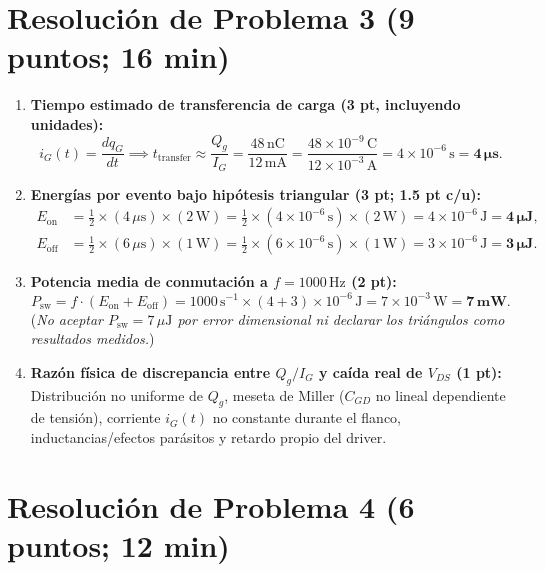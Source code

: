 \documentclass[11pt, a4paper]{article}
\begin{document}
\newpage
\section*{Resolución de Problema 3 (9 puntos; 16 min)}

\begin{enumerate}[label=\arabic*., noitemsep, topsep=2pt]
    \item \textbf{Tiempo estimado de transferencia de carga (3 pt, incluyendo unidades):}
    \[
        i_G(t) = \frac{dq_G}{dt} \implies t_{\text{transfer}} \approx \frac{Q_g}{I_G} = \frac{48\,\text{nC}}{12\,\text{mA}} = \frac{48 \times 10^{-9}\,\text{C}}{12 \times 10^{-3}\,\text{A}} = 4 \times 10^{-6}\,\text{s} = \mathbf{4\,\mu\text{s}}.
    \]
    \item \textbf{Energías por evento bajo hipótesis triangular (3 pt; 1.5 pt c/u):}
    \begin{align*}
        E_{\text{on}} &= \frac{1}{2} \times (4\,\mu\text{s}) \times (2\,\text{W}) = \frac{1}{2} \times (4 \times 10^{-6}\,\text{s}) \times (2\,\text{W}) = 4 \times 10^{-6}\,\text{J} = \mathbf{4\,\mu\text{J}}, \\
        E_{\text{off}} &= \frac{1}{2} \times (6\,\mu\text{s}) \times (1\,\text{W}) = \frac{1}{2} \times (6 \times 10^{-6}\,\text{s}) \times (1\,\text{W}) = 3 \times 10^{-6}\,\text{J} = \mathbf{3\,\mu\text{J}}.
    \end{align*}
    \item \textbf{Potencia media de conmutación a $f = 1000\,\text{Hz}$ (2 pt):}
    \[
        P_{\text{sw}} = f \cdot (E_{\text{on}} + E_{\text{off}}) = 1000\,\text{s}^{-1} \times (4 + 3)\times 10^{-6}\,\text{J} = 7 \times 10^{-3}\,\text{W} = \mathbf{7\,\text{mW}}.
    \]
    (\textit{No aceptar $P_{\text{sw}} = 7\,\mu\text{J}$ por error dimensional ni declarar los triángulos como resultados medidos.})
    \item \textbf{Razón física de discrepancia entre $Q_g/I_G$ y caída real de $V_{DS}$ (1 pt):} Distribución no uniforme de $Q_g$, meseta de Miller ($C_{GD}$ no lineal dependiente de tensión), corriente $i_G(t)$ no constante durante el flanco, inductancias/efectos parásitos y retardo propio del driver.
\end{enumerate}

\section*{Resolución de Problema 4 (6 puntos; 12 min)}
\end{document}
